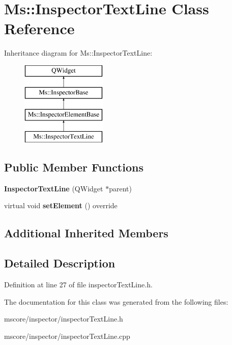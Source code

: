 \hypertarget{class_ms_1_1_inspector_text_line}{}\section{Ms\+:\+:Inspector\+Text\+Line Class Reference}
\label{class_ms_1_1_inspector_text_line}
Inheritance diagram for Ms\+:\+:Inspector\+Text\+Line\+:\begin{figure}[H]
\begin{center}
\leavevmode
\includegraphics[height=4.000000cm]{class_ms_1_1_inspector_text_line}
\end{center}
\end{figure}
\subsection*{Public Member Functions}
\begin{DoxyCompactItemize}
\item 
\mbox{\label{class_ms_1_1_inspector_text_line_a7e603a826bbebb0772fb3a6129fbdb70}} 
{\bfseries Inspector\+Text\+Line} (Q\+Widget $\ast$parent)
\item 
\mbox{\label{class_ms_1_1_inspector_text_line_a231af726514d73534ca7d333fa007dbc}} 
virtual void {\bfseries set\+Element} () override
\end{DoxyCompactItemize}
\subsection*{Additional Inherited Members}


\subsection{Detailed Description}


Definition at line 27 of file inspector\+Text\+Line.\+h.



The documentation for this class was generated from the following files\+:\begin{DoxyCompactItemize}
\item 
mscore/inspector/inspector\+Text\+Line.\+h\item 
mscore/inspector/inspector\+Text\+Line.\+cpp\end{DoxyCompactItemize}
